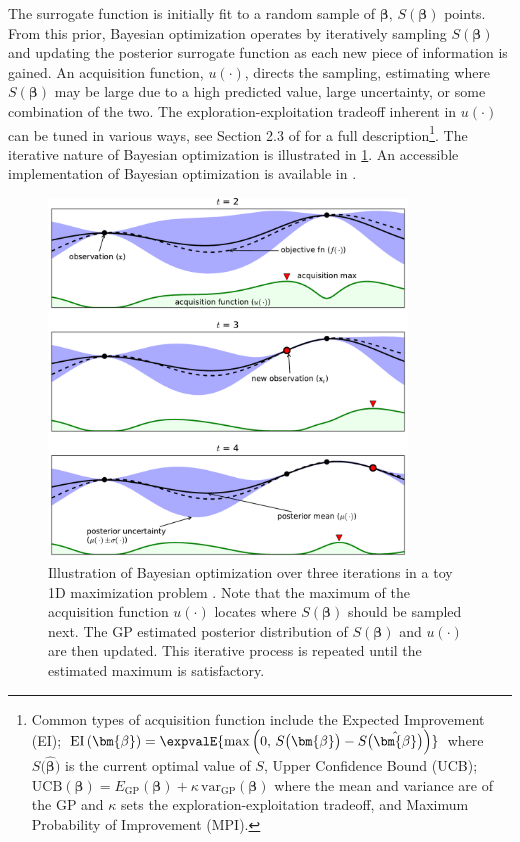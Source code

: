 The surrogate function is initially fit to
a random sample of $\bm{\beta}$, $S\left(\bm{\beta}\right)$ points.
From this prior, Bayesian optimization
operates by iteratively sampling $S\left(\bm{\beta}\right)$ and updating
the posterior surrogate function as each new piece of information is gained.
An acquisition function, $u\left(\cdot\right)$, directs the sampling,
estimating where $S\left(\bm{\beta}\right)$ may be large
due to a high predicted value, large uncertainty, or some combination of the two.
The exploration-exploitation tradeoff inherent in $u\left(\cdot\right)$
can be tuned in various ways, see Section 2.3 of \cite{Brochu2010} for a full description\footnote{Common types of acquisition function include the
Expected Improvement (EI);
$\text{EI}\left(\bm{\beta}\right) = \expvalE{\max\left(0,\,S\big(\bm{\beta}\big) - S\big(\hat{\bm{\beta}}\big)\right)}$
where $S\big(\hat{\bm{\beta}}\big)$ is the current optimal value of $S$,
Upper Confidence Bound (UCB);
$\text{UCB}\left(\bm{\beta}\right) = E_{\text{GP}} \left(\bm{\beta}\right) + \kappa\,\text{var}_{\text{GP}} \left(\bm{\beta}\right)$ where the mean and variance are of the GP and $\kappa$ sets the exploration-exploitation tradeoff,
and Maximum Probability of Improvement (MPI).}.
The iterative nature of Bayesian optimization is illustrated in \cref{fig:additional:unsupervised:BO:BO_ex}.
An accessible implementation of Bayesian optimization is available in \skopt \cite{scikit-optimize,Borisyak}.

\begin{figure}[H] %
\centering
\includegraphics[width=0.85\textwidth]{figures/ml/toyGPtext3.pdf}
\caption{
Illustration of Bayesian optimization over three iterations in a toy 1D maximization problem \cite{Brochu2010}.
Note that the maximum of the acquisition function $u\left(\cdot\right)$
locates where $S\left(\bm{\beta}\right)$ should be sampled next.
The GP estimated posterior distribution of $S\left(\bm{\beta}\right)$
and $u\left(\cdot\right)$ are then updated.
This iterative process is repeated until the estimated maximum is satisfactory.
}
\label{fig:additional:unsupervised:BO:BO_ex}
\end{figure}

